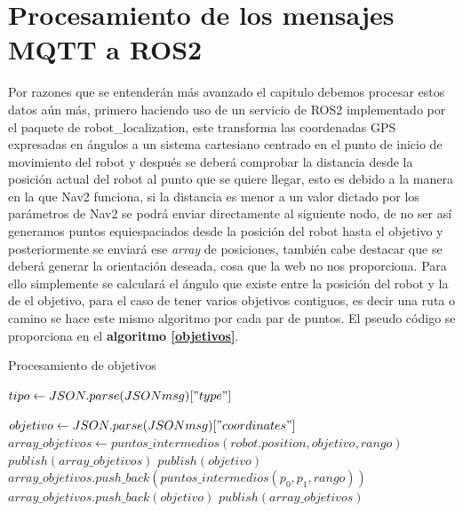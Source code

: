 \section{Procesamiento de los mensajes MQTT a ROS2}
Por razones que se entenderán más avanzado el capitulo debemos procesar estos datos aún más, primero haciendo uso de un servicio de ROS2 
implementado por el paquete de robot\_localization, este transforma las coordenadas GPS expresadas en ángulos a un sistema cartesiano 
centrado en el punto de inicio de movimiento del robot y después se deberá comprobar la distancia desde la posición actual del robot al punto que se quiere llegar, 
esto es debido a la manera en la que Nav2 funciona, si la distancia es menor a un valor dictado por los parámetros de Nav2 se podrá enviar directamente 
al siguiente nodo, de no ser así generamos puntos equiespaciados desde la posición del robot hasta el objetivo y posteriormente se enviará ese \textit{array} 
de posiciones, también cabe destacar que se deberá generar la orientación deseada, cosa que la web no nos proporciona.
Para ello simplemente se calculará el ángulo que existe entre la posición del robot y la de el objetivo, para el caso de tener varios objetivos contiguos, es decir una 
ruta o camino se hace este mismo algoritmo por cada par de puntos. El pseudo código se proporciona en el \textbf{algoritmo \ref{objetivos}}.

\begin{algorithm}[H]
  \caption{Procesamiento de objetivos}\label{objetivos}
  \begin{algorithmic}[1]
     
        \State $tipo\gets JSON.parse(JSONmsg)["type"]$
       
            \State $objetivo\gets JSON.parse(JSONmsg)["coordinates"]$
                \State $array\_objetivos \gets puntos\_intermedios(robot.position, objetivo, rango)$ 
                \State $publish(array\_objetivos)$
             \Else
                \State $publish(objetivo)$
             \EndIf
        \Else
             
                \State $array\_objetivos.push\_back( puntos\_intermedios(p_0, p_1, rango))$
             \Else
                \State $array\_objetivos.push\_back(objetivo)$
             \EndIf
            \EndFor
            \State $publish(array\_objetivos)$
        \EndIf
    \EndProcedure
  \end{algorithmic}
\end{algorithm}

